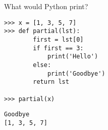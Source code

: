 \question What would Python print?

\begin{lstlisting}
>>> x = [1, 3, 5, 7]
>>> def partial(lst):
        first = lst[0]
        if first == 3:
            print('Hello')
        else:
            print('Goodbye')
        return lst

>>> partial(x)
\end{lstlisting}

\begin{solution}[2cm]
\begin{lstlisting}
Goodbye
[1, 3, 5, 7]
\end{lstlisting}
\end{solution}
